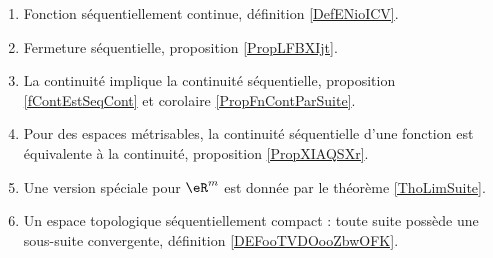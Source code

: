 
\begin{enumerate}
	\item
	      Fonction séquentiellement continue, définition \ref{DefENioICV}.
      \item
          Fermeture séquentielle, proposition \ref{PropLFBXIjt}.
	\item
	      La continuité implique la continuité séquentielle, proposition \ref{fContEstSeqCont} et corolaire \ref{PropFnContParSuite}.
	\item
	      Pour des espaces métrisables, la continuité séquentielle d'une fonction est équivalente à la continuité, proposition \ref{PropXIAQSXr}.
	\item
	      Une version spéciale pour \( \eR^m\) est donnée par le théorème \ref{ThoLimSuite}.
      \item
          Un espace topologique séquentiellement compact : toute suite possède une sous-suite convergente, définition \ref{DEFooTVDOooZbwOFK}.
\end{enumerate}


